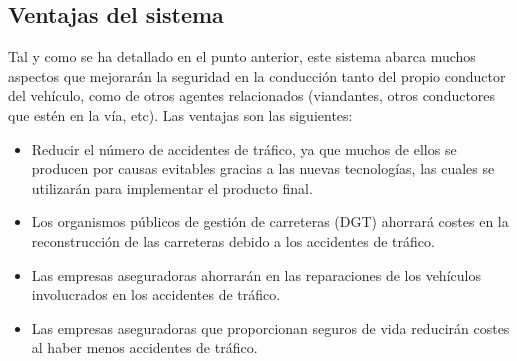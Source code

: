 \subsection{Ventajas del sistema}
\par Tal y como se ha detallado en el punto anterior, este sistema abarca muchos aspectos que mejorarán la seguridad en la conducción tanto del propio conductor del vehículo, como de otros agentes relacionados (viandantes, otros conductores que estén en la vía, etc). Las ventajas son las siguientes:
\begin{itemize}[-]
\item Reducir el número de accidentes de tráfico, ya que muchos de ellos se producen por causas evitables gracias a las nuevas tecnologías, las cuales se utilizarán para implementar el producto final.
\item Los organismos públicos de gestión de carreteras (DGT) ahorrará costes en  la reconstrucción de las carreteras debido a los accidentes de tráfico.
\item Las empresas aseguradoras ahorrarán en las reparaciones de los vehículos involucrados en los accidentes de tráfico.
\item Las empresas aseguradoras que proporcionan seguros de vida reducirán costes al haber menos accidentes de tráfico.
\end{itemize}
